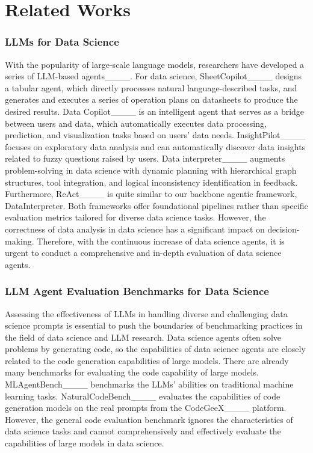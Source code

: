 \section{Related Works}
\label{sec: related_works}
\subsubsection{LLMs for Data Science} 
With the popularity of large-scale language models, researchers have developed a series of LLM-based agents____. 
For data science, SheetCopilot____ designs a tabular agent, which directly processes natural language-described tasks, and generates and executes a series of operation plans on datasheets to produce the desired results. 
Data Copilot____ is an intelligent agent that serves as a bridge between users and data, which automatically executes data processing, prediction, and visualization tasks based on users' data needs.
InsightPilot____ focuses on exploratory data analysis and can automatically discover data insights related to fuzzy questions raised by users.
Data interpreter____ augments problem-solving in data science with dynamic planning with hierarchical graph structures, tool integration, and logical inconsistency identification in feedback.
Furthermore, ReAct____ is quite similar to our backbone agentic framework, DataInterpreter. Both frameworks offer foundational pipelines rather than specific evaluation metrics tailored for diverse data science tasks.
However, the correctness of data analysis in data science has a significant impact on decision-making.
Therefore, with the continuous increase of data science agents, it is urgent to conduct a comprehensive and in-depth evaluation of data science agents.


\subsubsection{LLM Agent Evaluation Benchmarks for Data Science}

Assessing the effectiveness of LLMs in handling diverse and challenging data science prompts is essential to push the boundaries of benchmarking practices in the field of data science and LLM research.
Data science agents often solve problems by generating code, so the capabilities of data science agents are closely related to the code generation capabilities of large models. 
There are already many benchmarks for evaluating the code capability of large models.
MLAgentBench____ benchmarks the LLMs' abilities on traditional machine learning tasks.
NaturalCodeBench____ evaluates the capabilities of code generation models on the real prompts from the CodeGeeX____ platform.
However, the general code evaluation benchmark ignores the characteristics of data science tasks and cannot comprehensively and effectively evaluate the capabilities of large models in data science. 

